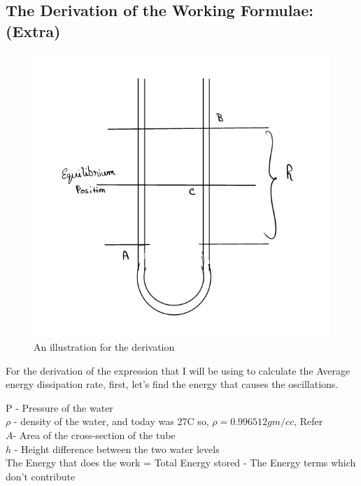 \documentclass[twocolumn,11pt]{article}
\begin{document}
\subsection{The Derivation of the Working Formulae:(\textbf{Extra})}
\begin{figure}[H]
    \centering
    \includegraphics[scale =0.6]{U-tube_Illustrations.png}
    \caption{An illustration for the derivation}
    \label{U-tube illustration}
\end{figure}

For the derivation of the expression that I will be using to calculate the Average energy dissipation rate, first, let's find the energy that causes the oscillations.

P - Pressure of the water\\
$\rho$ - density of the water, and today was 27\degree C so, $\rho = 0.996512 gm/cc$, Refer \cite{density_of_water_0-100_Celsius}\\
$A$- Area of the cross-section of the tube\\
$h$ - Height difference between the two water levels\\
The Energy that does the work =  Total Energy stored - The Energy terms which don't contribute
\end{document}

